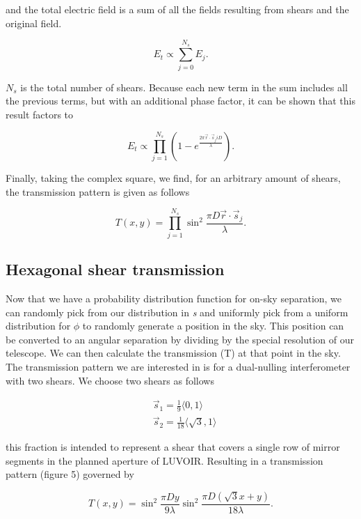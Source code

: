 \documentclass{article}
\begin{document}
and the total electric field is a sum of all the fields resulting from shears and the original field. 
	
	\begin{equation*}
	E_t \propto \sum^{N_{s}}_{j = 0} E_j.
	\end{equation*}
	
$N_s$ is the total number of shears. Because each new term in the sum includes all the previous terms, but with an additional phase factor, it can be shown that this result factors to
	
	\begin{equation*}
	E_t \propto \prod^{N_s}_{j = 1} (1 - e^{\frac{2 \pi \vec{r} \cdot\vec{s}_j i D}{\lambda}}).
	\end{equation*}
	
Finally, taking the complex square, we find, for an arbitrary amount of shears, the transmission pattern is given as follows
	
	\begin{equation}
	T(x,y) = \prod^{N_s}_{j = 1} \sin^2{\frac{\pi D \vec{r} \cdot\vec{s}_j }{\lambda}}.
	\end{equation}
	
	
	\subsection{Hexagonal shear transmission}
	Now that we have a probability distribution function for on-sky separation, we can randomly pick from our distribution in \textit{s} and uniformly pick from a uniform distribution for $\phi$ to randomly generate a position in the sky. This position can be converted to an angular separation by dividing by the special resolution of our telescope. We can then calculate the transmission (T) at that point in the sky. The transmission pattern we are interested in is for a dual-nulling interferometer with two shears. 	We choose two shears as follows
	
	\begin{align}
	&\vec{s}_1 = \frac{1}{9} \langle 0,1 \rangle \\
	&\vec{s}_2 = \frac{1}{18} \langle \sqrt{3}, 1 \rangle
	\end{align}
	
this fraction is intended to represent a shear that covers a single row of mirror segments in the planned aperture of LUVOIR. Resulting in a transmission pattern (figure 5) governed by 
	
	\begin{equation}
	T(x,y) = \sin^2{\frac{\pi D y}{9 \lambda}} \sin^2{\frac{\pi D (\sqrt{3}x + y)}{18 \lambda}}.
	\end{equation}
	
\end{document}
